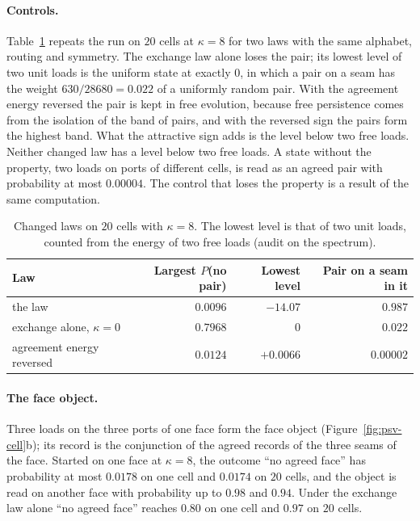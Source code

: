 \paragraph{Controls.}
Table~\ref{tab:psv-controls} repeats the run on $20$ cells at $\kappa=8$ for two laws with
the same alphabet, routing and symmetry. The exchange law alone loses the pair; its lowest
level of two unit loads is the uniform state at exactly $0$, in which a pair on a seam has
the weight $630/28680=0.022$ of a uniformly random pair. With the agreement energy reversed
the pair is kept in free evolution, because free persistence comes from the isolation of
the band of pairs, and with the reversed sign the pairs form the highest band. What the
attractive sign adds is the level below two free loads. Neither changed law has a level
below two free loads. A state without the property, two loads on ports of different cells,
is read as an agreed pair with probability at most $0.00004$. The control that loses the
property is a result of the same computation.

\begin{table}[htbp]
\centering\small
\caption{Changed laws on $20$ cells with $\kappa=8$. The lowest level is that of two unit
loads, counted from the energy of two free loads (audit on the spectrum).}
\label{tab:psv-controls}
\begin{tabular}{@{}lrrr@{}}
\toprule
Law & Largest $P$(no pair) & Lowest level & Pair on a seam in it\\
\midrule
the law & $0.0096$ & $-14.07$ & $0.987$\\
exchange alone, $\kappa=0$ & $0.7968$ & $0$ & $0.022$\\
agreement energy reversed & $0.0124$ & $+0.0066$ & $0.00002$\\
\bottomrule
\end{tabular}
\end{table}

\paragraph{The face object.}
Three loads on the three ports of one face form the face object
(Figure~\ref{fig:psv-cell}b); its record is the conjunction of the agreed records of the
three seams of the face. Started on one face at $\kappa=8$, the outcome ``no agreed face''
has probability at most $0.0178$ on one cell and $0.0174$ on $20$ cells, and the object is
read on another face with probability up to $0.98$ and $0.94$. Under the exchange law alone
``no agreed face'' reaches $0.80$ on one cell and $0.97$ on $20$ cells.

